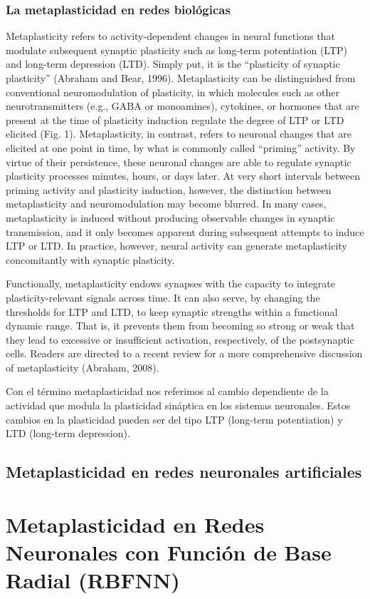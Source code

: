 \documentclass[10pt,a4paper, twocolumn]{report}
\begin{document}
\subsection{La metaplasticidad en redes biológicas}
Metaplasticity refers to activity-dependent changes in neural functions that modulate subsequent synaptic plasticity such as long-term potentiation (LTP) and long-term depression (LTD). Simply put, it is the “plasticity of synaptic plasticity” (Abraham and Bear, 1996). Metaplasticity can be distinguished from conventional neuromodulation of plasticity, in which molecules such as other neurotransmitters (e.g., GABA or monoamines), cytokines, or hormones that are present at the time of plasticity induction regulate the degree of LTP or LTD elicited (Fig. 1). Metaplasticity, in contrast, refers to neuronal changes that are elicited at one point in time, by what is commonly called “priming” activity. By virtue of their persistence, these neuronal changes are able to regulate synaptic plasticity processes minutes, hours, or days later. At very short intervals between priming activity and plasticity induction, however, the distinction between metaplasticity and neuromodulation may become blurred. In many cases, metaplasticity is induced without producing observable changes in synaptic transmission, and it only becomes apparent during subsequent attempts to induce LTP or LTD. In practice, however, neural activity can generate metaplasticity concomitantly with synaptic plasticity.

Functionally, metaplasticity endows synapses with the capacity to integrate plasticity-relevant signals across time. It can also serve, by changing the thresholds for LTP and LTD, to keep synaptic strengths within a functional dynamic range. That is, it prevents them from becoming so strong or weak that they lead to excessive or insufficient activation, respectively, of the postsynaptic cells. Readers are directed to a recent review for a more comprehensive discussion of metaplasticity (Abraham, 2008). 

Con el término metaplasticidad nos referimos al cambio dependiente de la actividad que modula la plasticidad sináptica en los sistemas neuronales. Estos cambios en la plasticidad pueden ser del tipo LTP (long-term potentiation) y LTD (long-term depression).
\section{Metaplasticidad en redes neuronales artificiales}
\chapter{Metaplasticidad en Redes Neuronales con Función de Base Radial (RBFNN)}
\end{document}
